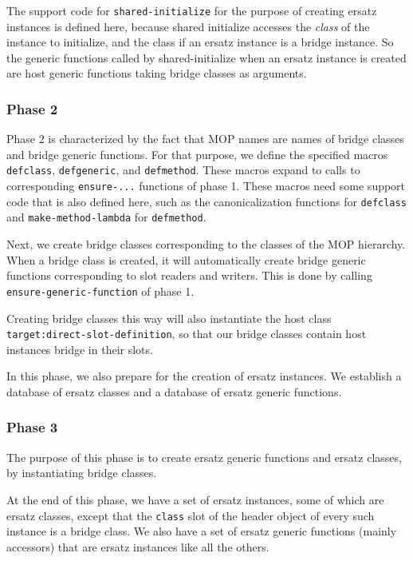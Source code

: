 The support code for \texttt{shared-initialize} for the purpose of
creating ersatz instances is defined here, because shared initialize
accesses the \emph{class} of the instance to initialize, and the class
if an ersatz instance is a bridge instance.  So the generic functions
called by shared-initialize when an ersatz instance is created are
host generic functions taking bridge classes as arguments. 

\subsubsection{Phase 2}

Phase 2 is characterized by the fact that MOP names are names of
bridge classes and bridge generic functions.  For that purpose, we
define the specified macros \texttt{defclass}, \texttt{defgeneric},
and \texttt{defmethod}.  These macros expand to calls to corresponding
\texttt{ensure-...} functions of phase 1.  These macros need some
support code that is also defined here, such as the canonicalization
functions for \texttt{defclass} and \texttt{make-method-lambda} for
\texttt{defmethod}.

Next, we create bridge classes corresponding to the classes of the MOP
hierarchy.  When a bridge class is created, it will automatically
create bridge generic functions corresponding to slot readers and
writers.  This is done by calling \texttt{ensure-generic-function} of
phase 1.

Creating bridge classes this way will also instantiate the host class
\texttt{target:direct-slot-definition}, so that our bridge classes
contain host instances bridge in their slots. 

In this phase, we also prepare for the creation of ersatz instances.
We establish a database of ersatz classes and a database of ersatz
generic functions.


\subsubsection{Phase 3}

The purpose of this phase is to create ersatz generic functions and
ersatz classes, by instantiating bridge classes.  

At the end of this phase, we have a set of ersatz instances, some of
which are ersatz classes, except that the \texttt{class} slot of the
header object of every such instance is a bridge class.  We also have
a set of ersatz generic functions (mainly accessors) that are ersatz
instances like all the others. 

